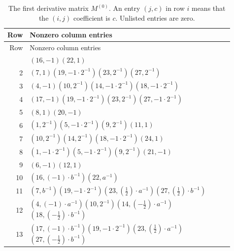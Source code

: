 \begingroup\small
\setlength{\tabcolsep}{3pt}
\renewcommand{\arraystretch}{1.16}
\begin{longtable}{@{}r>{\raggedright\arraybackslash}p{0.91\linewidth}@{}}
\caption{The first derivative matrix $M^{(0)}$. An entry $(j,c)$ in row $i$ means that the $(i,j)$ coefficient is $c$. Unlisted entries are zero.}\label{supp:matrix-M0}\\
\toprule Row & Nonzero column entries\\\midrule\endfirsthead
\toprule Row & Nonzero column entries\\\midrule\endhead
\bottomrule\endfoot
1 & \((16,-1)\)\allowbreak\quad \((22,1)\)\\
2 & \((7,1)\)\allowbreak\quad \((19,-1 \cdot 2^{-1})\)\allowbreak\quad \((23,2^{-1})\)\allowbreak\quad \((27,2^{-1})\)\\
3 & \((4,-1)\)\allowbreak\quad \((10,2^{-1})\)\allowbreak\quad \((14,-1 \cdot 2^{-1})\)\allowbreak\quad \((18,-1 \cdot 2^{-1})\)\\
4 & \((17,-1)\)\allowbreak\quad \((19,-1 \cdot 2^{-1})\)\allowbreak\quad \((23,2^{-1})\)\allowbreak\quad \((27,-1 \cdot 2^{-1})\)\\
5 & \((8,1)\)\allowbreak\quad \((20,-1)\)\\
6 & \((1,2^{-1})\)\allowbreak\quad \((5,-1 \cdot 2^{-1})\)\allowbreak\quad \((9,2^{-1})\)\allowbreak\quad \((11,1)\)\\
7 & \((10,2^{-1})\)\allowbreak\quad \((14,2^{-1})\)\allowbreak\quad \((18,-1 \cdot 2^{-1})\)\allowbreak\quad \((24,1)\)\\
8 & \((1,-1 \cdot 2^{-1})\)\allowbreak\quad \((5,-1 \cdot 2^{-1})\)\allowbreak\quad \((9,2^{-1})\)\allowbreak\quad \((21,-1)\)\\
9 & \((6,-1)\)\allowbreak\quad \((12,1)\)\\
10 & \((16,\left(-1\right) \cdot b^{-1})\)\allowbreak\quad \((22,a^{-1})\)\\
11 & \((7,b^{-1})\)\allowbreak\quad \((19,-1 \cdot 2^{-1})\)\allowbreak\quad \((23,\left(\frac{1}{2}\right) \cdot a^{-1})\)\allowbreak\quad \((27,\left(\frac{1}{2}\right) \cdot b^{-1})\)\\
12 & \((4,\left(-1\right) \cdot a^{-1})\)\allowbreak\quad \((10,2^{-1})\)\allowbreak\quad \((14,\left(-\frac{1}{2}\right) \cdot a^{-1})\)\allowbreak\quad \((18,\left(-\frac{1}{2}\right) \cdot b^{-1})\)\\
13 & \((17,\left(-1\right) \cdot b^{-1})\)\allowbreak\quad \((19,-1 \cdot 2^{-1})\)\allowbreak\quad \((23,\left(\frac{1}{2}\right) \cdot a^{-1})\)\allowbreak\quad \((27,\left(-\frac{1}{2}\right) \cdot b^{-1})\)\\

\end{longtable}
